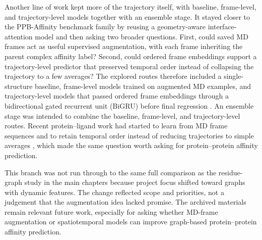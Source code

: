 Another line of work kept more of the trajectory itself, with baseline, frame-level, and trajectory-level models together with an ensemble stage. It stayed closer to the PPB-Affinity benchmark family by reusing a geometry-aware interface-attention model and then asking two broader questions. First, could saved MD frames act as useful supervised augmentation, with each frame inheriting the parent complex affinity label? Second, could ordered frame embeddings support a trajectory-level predictor that preserved temporal order instead of collapsing the trajectory to a few averages? The explored routes therefore included a single-structure baseline, frame-level models trained on augmented MD examples, and trajectory-level models that passed ordered frame embeddings through a bidirectional gated recurrent unit (BiGRU) before final regression \citep{Liu2024PPBAffinity,Schuster1997BRNN,Cho2014GRU}. An ensemble stage was intended to combine the baseline, frame-level, and trajectory-level routes. Recent protein--ligand work had started to learn from MD frame sequences and to retain temporal order instead of reducing trajectories to simple averages \citep{Libouban2025Spatiotemporal}, which made the same question worth asking for protein--protein affinity prediction.

This branch was not run through to the same full comparison as the residue-graph study in the main chapters because project focus shifted toward graphs with dynamic features. The change reflected scope and priorities, not a judgement that the augmentation idea lacked promise. The archived materials remain relevant future work, especially for asking whether MD-frame augmentation or spatiotemporal models can improve graph-based protein--protein affinity prediction.
